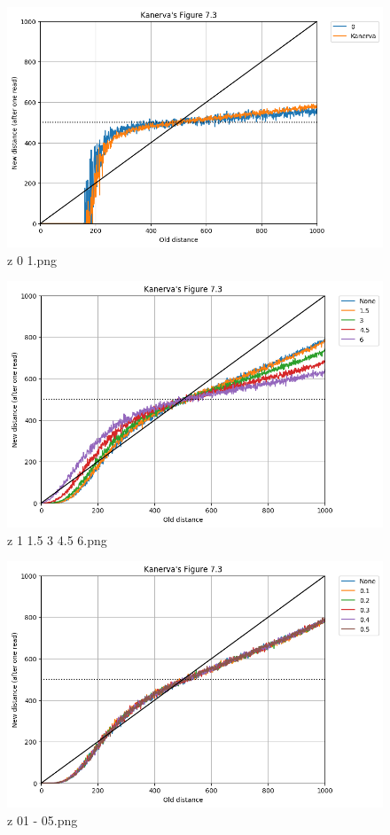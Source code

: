 \documentclass[11pt]{article} %
\begin{document}
\begin{figure}
  \includegraphics[width=\linewidth]{./images02/new-images/z_0_1.png}
  \caption{z 0 1.png}
  \label{fig:boat1}
\end{figure}



\begin{figure}
  \includegraphics[width=\linewidth]{./images02/new-images/z_1_15_3_45_6.png}
  \caption{z 1 1.5 3 4.5 6.png}
  \label{fig:boat1}
\end{figure}



\begin{figure}
  \includegraphics[width=\linewidth]{./images02/new-images/z_01-05.png}
  \caption{z 01 - 05.png}
  \label{fig:boat1}
\end{figure}
\end{document}

